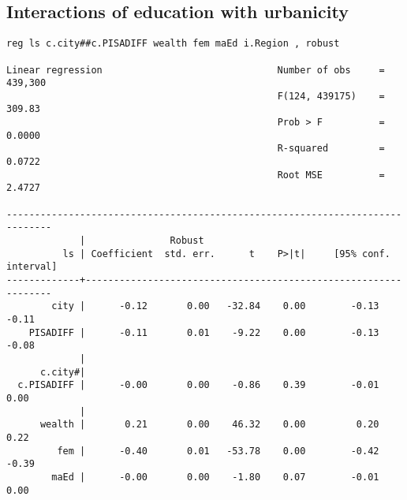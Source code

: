 \documentclass[10pt, letterpaper]{article}
\begin{document}
\begin{spacing}{1.4}




\section{Interactions of education with urbanicity}

\begin{spacing}{.9}
\begin{scriptsize}
\begin{verbatim}
reg ls c.city##c.PISADIFF wealth fem maEd i.Region , robust

Linear regression                               Number of obs     =    439,300
                                                F(124, 439175)    =     309.83
                                                Prob > F          =     0.0000
                                                R-squared         =     0.0722
                                                Root MSE          =     2.4727

------------------------------------------------------------------------------
             |               Robust
          ls | Coefficient  std. err.      t    P>|t|     [95% conf. interval]
-------------+----------------------------------------------------------------
        city |      -0.12       0.00   -32.84    0.00        -0.13       -0.11
    PISADIFF |      -0.11       0.01    -9.22    0.00        -0.13       -0.08
             |
      c.city#|
  c.PISADIFF |      -0.00       0.00    -0.86    0.39        -0.01        0.00
             |
      wealth |       0.21       0.00    46.32    0.00         0.20        0.22
         fem |      -0.40       0.01   -53.78    0.00        -0.42       -0.39
        maEd |      -0.00       0.00    -1.80    0.07        -0.01        0.00


\end{verbatim}
\end{scriptsize}
\end{spacing}
\end{spacing}
\end{document}
